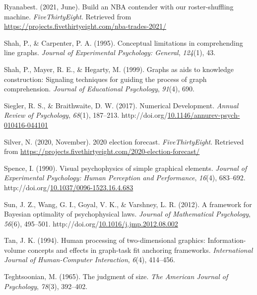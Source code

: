 \documentclass[print]{nuthesis}
\newlength{\cslhangindent}
\newenvironment{CSLReferences}%
{\setlength{\parindent}{0pt}%
\everypar{\setlength{\hangindent}{\cslhangindent}}\ignorespaces}%
{\par}
\begin{document}
\begin{CSLReferences}{1}{0}
\leavevmode{}%
Ryanabest. (2021, June). Build an NBA contender with our roster-shuffling machine. \emph{FiveThirtyEight}. Retrieved from \url{https://projects.fivethirtyeight.com/nba-trades-2021/}

\leavevmode{}%
Shah, P., \& Carpenter, P. A. (1995). Conceptual limitations in comprehending line graphs. \emph{Journal of Experimental Psychology: General}, \emph{124}(1), 43.

\leavevmode{}%
Shah, P., Mayer, R. E., \& Hegarty, M. (1999). Graphs as aids to knowledge construction: Signaling techniques for guiding the process of graph comprehension. \emph{Journal of Educational Psychology}, \emph{91}(4), 690.

\leavevmode{}%
Siegler, R. S., \& Braithwaite, D. W. (2017). Numerical {Development}. \emph{Annual Review of Psychology}, \emph{68}(1), 187--213. http://doi.org/\href{https://doi.org/10.1146/annurev-psych-010416-044101}{10.1146/annurev-psych-010416-044101}

\leavevmode{}%
Silver, N. (2020, November). 2020 election forecast. \emph{FiveThirtyEight}. Retrieved from \url{https://projects.fivethirtyeight.com/2020-election-forecast/}

\leavevmode{}%
Spence, I. (1990). Visual psychophysics of simple graphical elements. \emph{Journal of Experimental Psychology: Human Perception and Performance}, \emph{16}(4), 683--692. http://doi.org/\href{https://doi.org/10.1037/0096-1523.16.4.683}{10.1037/0096-1523.16.4.683}

\leavevmode{}%
Sun, J. Z., Wang, G. I., Goyal, V. K., \& Varshney, L. R. (2012). A framework for {Bayesian} optimality of psychophysical laws. \emph{Journal of Mathematical Psychology}, \emph{56}(6), 495--501. http://doi.org/\href{https://doi.org/10.1016/j.jmp.2012.08.002}{10.1016/j.jmp.2012.08.002}

\leavevmode{}%
Tan, J. K. (1994). Human processing of two-dimensional graphics: Information-volume concepts and effects in graph-task fit anchoring frameworks. \emph{International Journal of Human-Computer Interaction}, \emph{6}(4), 414--456.

\leavevmode{}%
Teghtsoonian, M. (1965). The judgment of size. \emph{The American Journal of Psychology}, \emph{78}(3), 392--402.


\end{CSLReferences}
\end{document}
